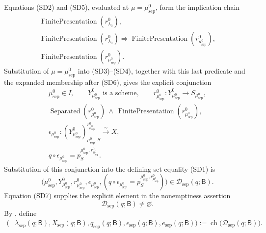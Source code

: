 \begin{definition}
\[  \]
  Equations (SD2) and (SD5), evaluated at
  \(\mu=\mu_{\mathrm{sep}}^0\), form the implication chain
  \[
  \begin{gathered}
    \operatorname{FinitePresentation}(r_{\lambda_0}^0),\\
    \operatorname{FinitePresentation}(r_{\lambda_0}^0)
      \Longrightarrow
      \operatorname{FinitePresentation}(r_{\mu_{\mathrm{sep}}^0}^0),\\
    \operatorname{FinitePresentation}(r_{\mu_{\mathrm{sep}}^0}^0).
  \end{gathered}
  \]
  Substitution of \(\mu=\mu_{\mathrm{sep}}^0\) into (SD3)--(SD4), together
  with this last predicate and the expanded membership after (SD6), gives the
  explicit conjunction
  \[
  \begin{gathered}
    \mu_{\mathrm{sep}}^0\in I,\qquad
    Y_{\mu_{\mathrm{sep}}^0}^0\text{ is a scheme},\qquad
    r_{\mu_{\mathrm{sep}}^0}^0\colon
      Y_{\mu_{\mathrm{sep}}^0}^0\to S_{\mu_{\mathrm{sep}}^0},\\
    \operatorname{Separated}(r_{\mu_{\mathrm{sep}}^0}^0)
      \ \wedge\
    \operatorname{FinitePresentation}(r_{\mu_{\mathrm{sep}}^0}^0),\\
    \epsilon_{\mu_{\mathrm{sep}}^0}\colon
      (Y_{\mu_{\mathrm{sep}}^0}^0)_{
        \mu_{\mathrm{sep}}^0,S}^{r_{\mu_{\mathrm{sep}}^0}^0}
        \xrightarrow{\sim}X,\\
    q\circ\epsilon_{\mu_{\mathrm{sep}}^0}
      =p_S^{\mu_{\mathrm{sep}}^0,r_{\mu_{\mathrm{sep}}^0}^0}.
  \end{gathered}
  \]
  Substitution of this conjunction into the defining set equality (SD1) is
  \[
    \bigl(
      \mu_{\mathrm{sep}}^0,Y_{\mu_{\mathrm{sep}}^0}^0,
      r_{\mu_{\mathrm{sep}}^0}^0,\epsilon_{\mu_{\mathrm{sep}}^0},
      (q\circ\epsilon_{\mu_{\mathrm{sep}}^0}
        =p_S^{\mu_{\mathrm{sep}}^0,r_{\mu_{\mathrm{sep}}^0}^0})
    \bigr)
      \in\mathscr D_{\mathrm{sep}}(q;\mathsf B).                  \tag{SD7}
  \]
  Equation (SD7) supplies the explicit element in the nonemptiness assertion
  \[
    \mathscr D_{\mathrm{sep}}(q;\mathsf B)\neq\varnothing.        \tag{SD8}
  \]
  By , define
  \[
  \begin{split}
    \bigl(&
      \lambda_{\mathrm{sep}}(q;\mathsf B),
      X_{\mathrm{sep}}(q;\mathsf B),
      q_{\mathrm{sep}}(q;\mathsf B),
      \epsilon_{\mathrm{sep}}(q;\mathsf B),
      e_{\mathrm{sep}}(q;\mathsf B)
    \bigr)
      :=\operatorname{ch}
        \bigl(\mathscr D_{\mathrm{sep}}(q;\mathsf B)\bigr).
  \end{split}                                                       \tag{SD9}
  \]
\end{definition}

